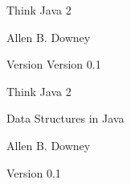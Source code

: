 \documentclass[12pt]{book}
\title{\thetitle}
\author{Allen B. Downey}
\newcommand{\theversion}{Version 0.1}
\theoremstyle{exercise}
\begin{document}
\frontmatter


\begin{htmlonly}


{\Large Think Java 2}

{\large Allen B. Downey}

Version \theversion

\setcounter{chapter}{-1}

\end{htmlonly}




\begin{latexonly}


%
%
%
%
%
%



\pagebreak
\thispagestyle{empty}

\begin{flushright}
\vspace*{2.5in}

{\huge Think Java 2}

\vspace{0.25in}

{\LARGE Data Structures in Java}

\vspace{1in}

{\Large
Allen B. Downey
}


\vspace{1in}

{\Large \theversion}

\vfill

\end{flushright}


\pagebreak
\thispagestyle{empty}


\end{latexonly}
\end{document}
